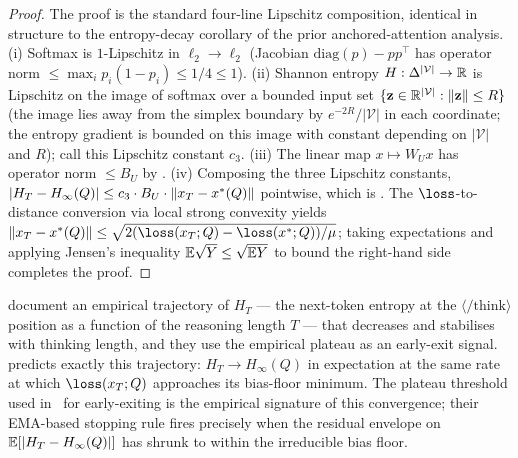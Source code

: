 \begin{proof}
The proof is the standard four-line Lipschitz composition, identical in
structure to the entropy-decay corollary of the prior anchored-attention
analysis. (i) Softmax is $1$-Lipschitz in $\ell_2 \to \ell_2$ (Jacobian
$\mathrm{diag}(p) - p p^\top$ has operator norm
$\le \max_i p_i (1 - p_i) \le 1/4 \le 1$). (ii) Shannon entropy
$H: \Delta^{|\mathcal V|} \to \mathbb{R}$ is Lipschitz on the image of softmax
over a bounded input set
$\{\mathbf z \in \mathbb{R}^{|\mathcal V|}: \left\| \mathbf z \right\| \le R\}$
(the image lies away from the simplex boundary by $e^{-2R}/|\mathcal V|$
in each coordinate; the entropy gradient is bounded on this image with
constant depending on $|\mathcal V|$ and $R$); call this Lipschitz
constant $c_3$. (iii) The linear map $x \mapsto W_U x$ has operator
norm $\le B_U$ by . (iv) Composing the three
Lipschitz constants, $|H_T - H_\infty(Q)| \le c_3 \cdot B_U \cdot \left\| x_T - x^*(Q) \right\|$
pointwise, which is . The
$\loss$-to-distance conversion via local strong convexity yields
$\norm{x_T - x^*(Q)} \le \sqrt{2 (\loss(x_T; Q) - \loss(x^*; Q)) / \mu}$;
taking expectations and applying Jensen's inequality
$\mathbb{E}\sqrt{Y} \le \sqrt{\mathbb{E} Y}$ to bound the right-hand side completes the
proof.
\end{proof}

\begin{remark}\label{rem:choi2025_entropy_link}
\citet{choi2025entropy} document an empirical trajectory of $H_T$ ---
the next-token entropy at the $\langle/\mathrm{think}\rangle$ position as
a function of the reasoning length $T$ --- that decreases and stabilises
with thinking length, and they use the empirical plateau as an early-exit
signal.  predicts exactly this trajectory:
$H_T \to H_\infty(Q)$ in expectation at the same rate at which
$\loss(x_T; Q)$ approaches its bias-floor minimum. The plateau threshold
used in~\cite{choi2025entropy} for early-exiting is the empirical signature
of this convergence; their EMA-based stopping rule fires precisely when
the residual envelope on
$\mathbb{E}[|H_T - H_\infty(Q)|]$ has shrunk to within the irreducible bias
floor.
\end{remark}


